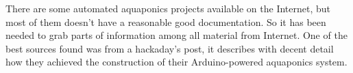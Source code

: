 There are some automated aquaponics projects available on the Internet,
but most of them doesn't have a reasonable good documentation.
So it has been needed to grab parts of information among all material from Internet.
One of the best sources found was from a hackaday's post,
it describes with decent detail how they achieved the construction of their Arduino-powered aquaponics system.

\begin{itemize}

\end{itemize}
